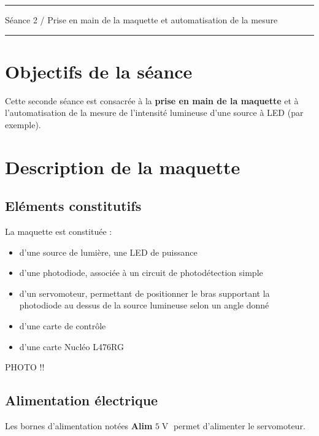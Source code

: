 \documentclass[a4paper,11pt,titlepage]{article} %
\begin{document}
\vspace{0.5cm}

\noindent \rule{\linewidth}{1pt}

{\noindent\Large \rule[-7pt]{0pt}{30pt} Séance 2 / Prise en main de la maquette et automatisation de la mesure} 

\noindent \rule{\linewidth}{1pt}


\section{Objectifs de la séance}

Cette seconde séance est consacrée à la \textbf{prise en main de la maquette} et à l'automatisation de la mesure de l'intensité lumineuse d'une source à LED (par exemple).


\section{Description de la maquette}


\subsection{Eléments constitutifs}

La maquette est constituée :

\begin{itemize}
	\item d'une source de lumière, une LED de puissance
	\item d'une photodiode, associée à un circuit de photodétection simple
	\item d'un servomoteur, permettant de positionner le bras supportant la photodiode au dessus de la source lumineuse selon un angle donné
	\item d'une carte de contrôle
	\item d'une carte Nucléo L476RG
\end{itemize}

PHOTO !!

\subsection{Alimentation électrique}

Les bornes d'alimentation notées \textbf{Alim} $5\operatorname{V}$ permet d'alimenter le servomoteur.
\end{document}
